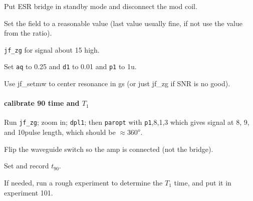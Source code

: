 
Put ESR bridge in standby mode and disconnect the mod coil.

Set the field to a reasonable value (last value usually fine, if not use the value from the ratio).

\texttt{jf\_zg} for signal about 15 high.

Set \texttt{aq} to 0.25 and \texttt{d1} to 0.01 and \texttt{p1} to 1u.

Use jf\_setmw to center resonance in gs (or just jf\_zg if SNR is no good).

\paragraph{calibrate 90 time and $T_1$}

Run \texttt{jf_zg}; zoom in; \texttt{dpl1}; then \texttt{paropt} with \texttt{p1},8,1,3 which gives signal at 8\us, 9\us, and 10\us pulse length, which should be $\approx 360^o$.

Flip the waveguide switch so the amp is connected (not the bridge).

Set and record $t_{90}$.

If needed, run a rough experiment to determine the $T_1$ time, and put it in experiment 101.

